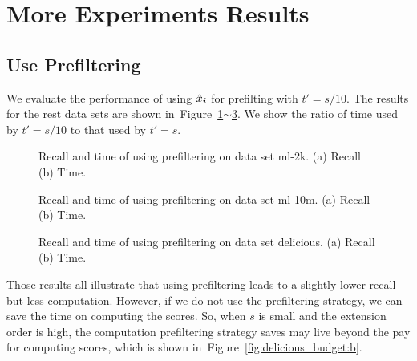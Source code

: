 \documentclass[letterpaper]{article}
\newcommand{\V}[1]{{\boldsymbol{{\MakeLowercase{#1}}}}}
\newcommand{\predx}{\hat{x}_{\V{i}}}
\newcommand{\Fig}[1]{Figure~\ref{fig:#1}}
\newcommand{\Figs}[2]{Figure~\ref{fig:#1}$\sim$\ref{fig:#2}}
\begin{document}
\section{More Experiments Results}

\subsection{Use Prefiltering}
We evaluate the performance of using $\predx$ for prefilting with $t'=s/10$. 
The results for the rest data sets are shown in~\Figs{ml_2k_budget}{delicious_budget}. 
We show the ratio of time used by $t'=s/10$ to that used by $t'=s$.
\begin{figure}[H]
    \centering   
\caption{Recall and time of using prefiltering on data set ml-2k. 
        (a) Recall (b) Time.}
\label{fig:ml_2k_budget}    
\end{figure}
\begin{figure}[H]
    \centering   
\caption{Recall and time of using prefiltering on data set ml-10m. 
        (a) Recall (b) Time.}
\label{fig:ml_10m_budget}    
\end{figure}
\begin{figure}[H]
    \centering   
\caption{Recall and time of using prefiltering on data set delicious. 
        (a) Recall (b) Time.}
\label{fig:delicious_budget}    
\end{figure}
Those results all illustrate that using prefiltering leads to a slightly lower recall but less
computation. However, if we do not use the prefiltering strategy, we can save the time on computing the scores.
So, when $s$ is small and the extension order is high, the computation prefiltering strategy saves may live beyond the pay for computing scores,
which is shown in~\Fig{delicious_budget:b}.
\end{document}
